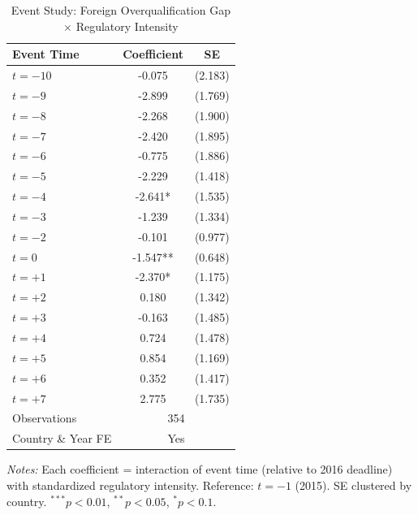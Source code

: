 \begin{table}[t]
\centering
\caption{Event Study: Foreign Overqualification Gap $\times$ Regulatory Intensity}
\label{tab:eventstudy}
\begin{tabular}{lcc}
\toprule
Event Time & Coefficient & SE \\
\midrule
$t = -10$ & -0.075 & (2.183) \\
$t = -9$ & -2.899 & (1.769) \\
$t = -8$ & -2.268 & (1.900) \\
$t = -7$ & -2.420 & (1.895) \\
$t = -6$ & -0.775 & (1.886) \\
$t = -5$ & -2.229 & (1.418) \\
$t = -4$ & -2.641* & (1.535) \\
$t = -3$ & -1.239 & (1.334) \\
$t = -2$ & -0.101 & (0.977) \\
$t = 0$ & -1.547** & (0.648) \\
$t = +1$ & -2.370* & (1.175) \\
$t = +2$ & 0.180 & (1.342) \\
$t = +3$ & -0.163 & (1.485) \\
$t = +4$ & 0.724 & (1.478) \\
$t = +5$ & 0.854 & (1.169) \\
$t = +6$ & 0.352 & (1.417) \\
$t = +7$ & 2.775 & (1.735) \\
\midrule
Observations & \multicolumn{2}{c}{354} \\
Country \& Year FE & \multicolumn{2}{c}{Yes} \\
\bottomrule
\end{tabular}
\begin{tablenotes}[flushleft]\footnotesize
\item \textit{Notes:} Each coefficient = interaction of event time (relative to 2016 deadline) with standardized regulatory intensity. Reference: $t = -1$ (2015). SE clustered by country. $^{***}p<0.01$, $^{**}p<0.05$, $^{*}p<0.1$.
\end{tablenotes}
\end{table}
